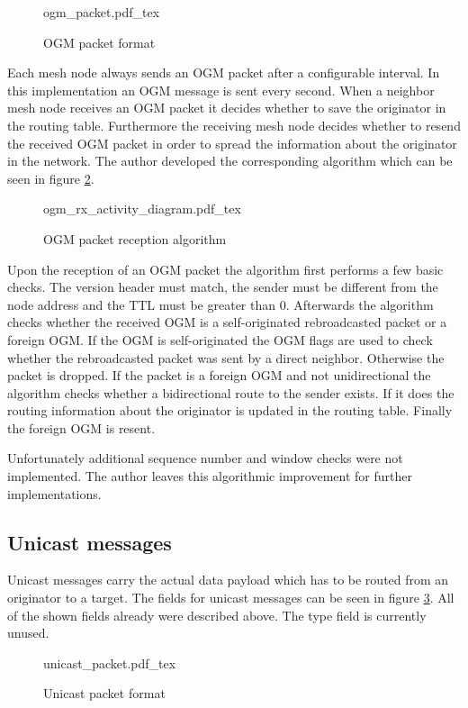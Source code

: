 \begin{figure}[H]
    \centering
    {ogm_packet.pdf_tex}
    \caption{OGM packet format}
    \label{fig:ogm}
\end{figure}

Each mesh node always sends an OGM packet after a configurable interval. In this implementation an OGM message is sent every second. When a neighbor mesh node receives an OGM packet it decides whether to save the originator in the routing table. Furthermore the receiving mesh node decides whether to resend the received OGM packet in order to spread the information about the originator in the network. The author developed the corresponding algorithm which can be seen in figure \ref{fig:ogm_rx}.

\begin{figure}[H]
    \centering
    \sffamily
    {ogm_rx_activity_diagram.pdf_tex}
    \rmfamily
    \caption{OGM packet reception algorithm}
    \label{fig:ogm_rx}
\end{figure}

Upon the reception of an OGM packet the algorithm first performs a few basic checks. The version header must match, the sender must be different from the node address and the TTL must be greater than 0. Afterwards the algorithm checks whether the received OGM is a self-originated rebroadcasted packet or a foreign OGM. If the OGM is self-originated the OGM flags are used to check whether the rebroadcasted packet was sent by a direct neighbor. Otherwise the packet is dropped. If the packet is a foreign OGM and not unidirectional the algorithm checks whether a bidirectional route to the sender exists. If it does the routing information about the originator is updated in the routing table. Finally the foreign OGM is resent.

Unfortunately additional sequence number and window checks were not implemented. The author leaves this algorithmic improvement for further implementations.

\subsection{Unicast messages}%
Unicast messages carry the actual data payload which has to be routed from an originator to a target. The fields for unicast messages can be seen in figure \ref{fig:unicast_packet}. All of the shown fields already were described above. The type field is currently unused.

\begin{figure}[H]
    \centering
    {unicast_packet.pdf_tex}
    \caption{Unicast packet format}
    \label{fig:unicast_packet}
\end{figure}


